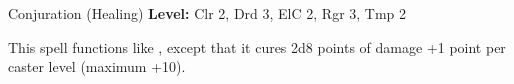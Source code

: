{Conjuration (Healing)}
{
	\textbf{Level:}
	Clr 2, Drd 3, ElC 2, Rgr 3, Tmp 2\\
}
{
	This spell functions like , except that it cures 2d8 points of damage +1 point per caster level (maximum +10).

}
